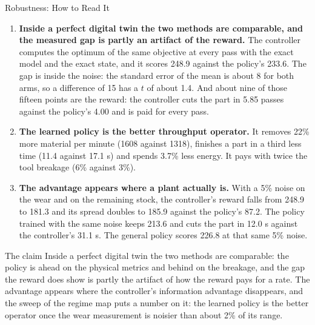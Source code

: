 \documentclass[11pt,aspectratio=169]{beamer}
\begin{document}
\begin{frame}{Robustness: How to Read It}
    \scriptsize
    \begin{enumerate}
        \item \textbf{Inside a perfect digital twin the two methods are comparable, and the measured
        gap is partly an artifact of the reward.} The controller computes the optimum of the same
        objective at every pass with the exact model and the exact state, and it scores 248.9
        against the policy's 233.6. The gap is inside the noise: the standard error of the mean is
        about 8 for both arms, so a difference of 15 has a $t$ of about 1.4. And about nine of those
        fifteen points are the reward: the controller cuts the part in 5.85 passes against the
        policy's 4.00 and is paid for every pass.
        \item \textbf{The learned policy is the better throughput operator.} It removes \alert{22\% more
        material per minute} (1608 against 1318), finishes a part in \alert{a third less time} (11.4
        against 17.1 s) and spends 3.7\% less energy. It pays with twice the tool breakage (6\% against 3\%).
        \item \textbf{The advantage appears where a plant actually is.} With a 5\% noise on the wear and
        on the remaining stock, the controller's reward falls from 248.9 to 181.3 and its spread
        doubles to 185.9 against the policy's 87.2. The policy trained with the same noise keeps 213.6
        and cuts the part in 12.0 s against the controller's 31.1 s. The general policy scores 226.8
        at that same 5\% noise.
    \end{enumerate}

    \vspace{0.1em}
    \begin{alertblock}{The claim}
    \scriptsize
    Inside a perfect digital twin the two methods are comparable: the policy is ahead on the physical
    metrics and behind on the breakage, and the gap the reward does show is partly the artifact of how
    the reward pays for a rate. The advantage appears where the controller's information advantage
    disappears, and the sweep of the regime map puts a number on it: the learned policy is the better
    operator once the wear measurement is noisier than \alert{about 2\% of its range}.
    \end{alertblock}
\end{frame}
\end{document}
